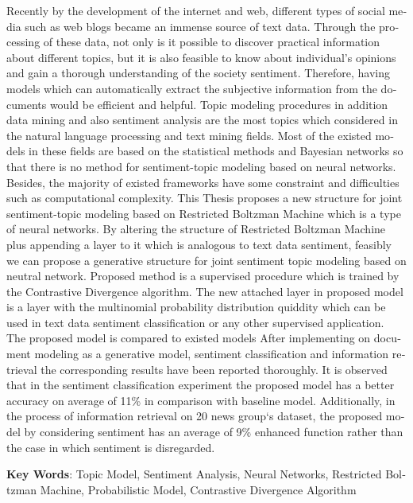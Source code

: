 \begin{latin}
	\begin{small}
		\baselineskip=0.6cm
Recently by the development of the internet and web, different types of social media such as web blogs became an immense source of text data. Through the processing of these data, not only is it possible to discover practical information about different topics, but it is also feasible to know about individual’s opinions and gain a thorough understanding of the society sentiment. Therefore, having models which can automatically extract the subjective information from the documents would be efficient and helpful. Topic modeling procedures in addition data mining and also sentiment analysis are the most topics which considered in the natural language processing and text mining fields. Most of the existed models in these fields are based on the statistical methods and Bayesian networks so that there is no method for sentiment-topic modeling based on neural networks. Besides, the majority of existed frameworks have some constraint and difficulties such as computational complexity. This Thesis proposes a new structure for joint sentiment-topic modeling based on Restricted Boltzman Machine which is a type of neural networks. By altering the structure of Restricted Boltzman Machine plus appending a layer to it which is analogous to text data sentiment, feasibly we can propose a generative structure for joint sentiment topic modeling based on neutral network. Proposed method is a supervised procedure which is trained by the Contrastive Divergence algorithm. The new attached layer in proposed model is a layer with the multinomial probability distribution quiddity which can be used in text data sentiment classification or any other supervised application. The proposed model is compared to existed models After implementing on document modeling as a generative model, sentiment classification and information retrieval the corresponding results have been reported thoroughly. It is observed that in the sentiment classification experiment the proposed model has a better accuracy on average of 11\% in comparison with baseline model. Additionally, in the process of information retrieval on 20 news group‘s dataset, the proposed model by considering sentiment has an average of 9\% enhanced function rather than the case in which sentiment is disregarded. 
	
		
	\end{small}
	
	\vspace{0.5 cm}
	
	
	\noindent \textbf{Key Words}: Topic Model, Sentiment Analysis, Neural Networks, Restricted Boltzman Machine, Probabilistic Model, Contrastive Divergence Algorithm
\end{latin}
